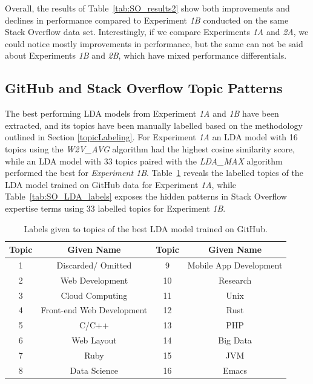             Overall, the results of Table~\ref{tab:SO_results2} show both improvements and declines in performance compared to Experiment \emph{1B} conducted on the same Stack Overflow data set. Interestingly, if we compare Experiments \emph{1A} and \emph{2A}, we could notice mostly improvements in performance, but the same can not be said about Experiments \emph{1B} and \emph{2B}, which have mixed performance differentials. 
            
        \subsection{GitHub and Stack Overflow Topic Patterns\label{topic_patterns}}
        
            The best performing LDA models from Experiment \emph{1A} and \emph{1B} have been extracted, and its topics have been manually labelled based on the methodology outlined in Section \ref{topicLabeling}. For Experiment \emph{1A} an LDA model with 16 topics using the \emph{W2V\_AVG} algorithm had the highest cosine similarity score, while an LDA model with 33 topics paired with the \emph{LDA\_MAX} algorithm performed the best for \emph{Experiment 1B}. Table~\ref{tab:GH_LDA_labels} reveals the labelled topics of the LDA model trained on GitHub data for Experiment \emph{1A}, while Table~\ref{tab:SO_LDA_labels} exposes the hidden patterns in Stack Overflow expertise terms using 33 labelled topics for Experiment \emph{1B}.
     
            \begin{table}
              \centering
              \caption{Labels given to topics of the best LDA model trained on GitHub.}\label{tab:GH_LDA_labels}
                \vspace{6pt} %
              \begin{tabular}{|c c|c c|}
                \hline
                Topic & Given Name & Topic & Given Name \\
                \hline
                1 & Discarded/ Omitted & 9 & Mobile App Development \\
                2 & Web Development & 10 & Research \\
                3 & Cloud Computing & 11 & Unix \\
                4 & Front-end Web Development & 12 & Rust \\
                5 & C/C++ & 13 & PHP \\
                6 & Web Layout & 14 & Big Data \\
                7 & Ruby & 15 & JVM \\
                8 & Data Science & 16 & Emacs \\
                \hline
              \end{tabular}%
            \end{table}
            
